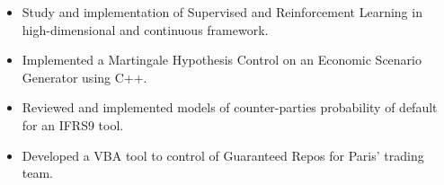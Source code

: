 
\begin{itemize}
\item Study and implementation of Supervised and Reinforcement Learning in high-dimensional and continuous framework.
\end{itemize}

\divider
{}
\begin{itemize}
\item Implemented a Martingale Hypothesis Control on an Economic Scenario Generator using C++.
\item Reviewed and implemented models of counter-parties probability of default for an IFRS9 tool.
\end{itemize}

\divider

\begin{itemize}
\item Developed a VBA tool to control of Guaranteed Repos for Paris' trading team.
\end{itemize}

